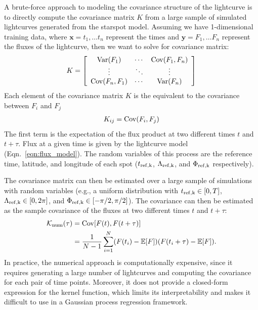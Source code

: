 \documentclass[preprint]{aastex702}
\begin{document}
A brute-force approach to modeling the covariance structure of the lightcurve is to directly compute the covariance matrix $K$ from a large sample of simulated lightcurves generated from the starspot model.
Assuming we have 1-dimensional training data, where $\mathbf{x} = {t_1,\dots t_n}$ represent the times and $\mathbf{y} = {F_1,\dots F_n}$ represent the fluxes of the lightcurve, then we want to solve for covariance matrix:
\begin{equation}
    K = 
      \left[ {\begin{array}{ccc}
        {\rm Var}(F_1)  & \cdots & {\rm Cov}(F_1,F_n) \\
        \vdots  & \ddots & \vdots\\
        {\rm Cov}(F_n,F_1)  & \cdots & {\rm Var}(F_n) \\
      \end{array} } \right]
\end{equation}
Each element of the covariance matrix $K$ is the equivalent to the covariance between $F_i$ and $F_j$
\begin{align}
    K_{ij} = {\rm Cov}(F_i, F_j) 
\end{align}
The first term is the expectation of the flux product at two different times $t$ and $t+\tau$. Flux at a given time is given by the \citet{kipping_analytic_2012} lightcurve model (Eqn.~\ref{eqn:flux_model}). The random variables of this process are the reference time, latitude, and longitude of each spot ($t_{\rm ref,k}$, $\Lambda_{\rm ref,k}$, and $\Phi_{\rm ref,k}$ respectively).

The covariance matrix can then be estimated over a large sample of simulations with  random variables (e.g., a uniform distribution with $t_{\rm ref,k} \in [0, T]$, $\Lambda_{\rm ref,k} \in [0, 2\pi]$, and $\Phi_{\rm ref,k} \in [-\pi/2, \pi/2]$). The covariance can then be estimated as the sample covariance of the fluxes at two different times $t$ and $t+\tau$:
\begin{align}
    \mathcal{K}_{\rm num}(\tau) 
        &= \mathrm{Cov}[F(t), F(t+\tau)]  \\
        &= \frac{1}{N - 1} \sum_{i=1}^N  (F(t_i) - \mathbb{E}[F]) (F(t_i+\tau )- \mathbb{E}[F]).
    \label{eq:numerical_kernel}
\end{align}
In practice, the numerical approach is computationally expensive, since it requires generating a large number of lightcurves and computing the covariance for each pair of time points. Moreover, it does not provide a closed-form expression for the kernel function, which limits its interpretability and makes it difficult to use in a Gaussian process regression framework.
\end{document}
